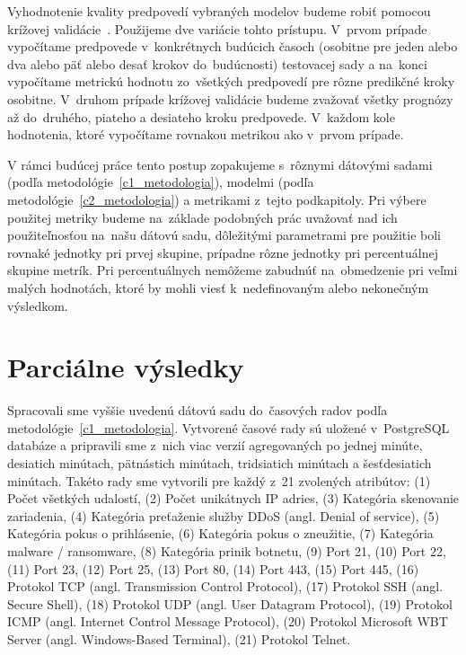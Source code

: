 \documentclass[thesismargins, thesislinespacing, openright, upjsfrontpage]{rnthesis}
\begin{document}
Vyhodnotenie kvality predpovedí vybraných modelov budeme robiť pomocou krížovej validácie~\cite{hyndman2018forecasting}. Použijeme dve variácie tohto prístupu. V~prvom prípade vypočítame predpovede v~konkrétnych budúcich časoch (osobitne pre jeden alebo dva alebo päť alebo desať krokov do~budúcnosti) testovacej sady a na~konci vypočítame metrickú hodnotu zo~všetkých predpovedí pre rôzne predikčné kroky osobitne. V~druhom prípade krížovej validácie budeme zvažovať všetky prognózy až do~druhého, piateho a desiateho kroku predpovede. V~každom kole hodnotenia, ktoré vypočítame rovnakou metrikou ako v~prvom prípade.

V rámci budúcej práce tento postup zopakujeme s~rôznymi dátovými sadami (podľa metodológie~\ref{c1_metodologia}), modelmi (podľa metodológie~\ref{c2_metodologia}) a metrikami z~tejto podkapitoly. Pri výbere použitej metriky budeme na~základe podobných prác uvažovať nad ich použiteľnosťou na~našu dátovú sadu, dôležitými parametrami pre použitie boli rovnaké jednotky pri prvej skupine, prípadne rôzne jednotky pri percentuálnej skupine metrík. Pri percentuálnych nemôžeme zabudnúť na~obmedzenie pri veľmi malých hodnotách, ktoré by mohli viesť k~nedefinovaným alebo nekonečným výsledkom.

\chapter{Parciálne výsledky}

Spracovali sme vyššie uvedenú dátovú sadu do~časových radov podľa metodológie~\ref{c1_metodologia}. Vytvorené časové rady sú uložené v~PostgreSQL databáze a pripravili sme z~nich viac verzií agregovaných po jednej minúte, desiatich minútach, pätnástich minútach, tridsiatich minútach a šesťdesiatich minútach. Takéto rady sme vytvorili pre každý z~21 zvolených atribútov: (1) Počet všetkých udalostí, (2) Počet unikátnych IP adries, (3)  Kategória skenovanie zariadenia, (4) Kategória preťaženie služby DDoS (angl. Denial of service), (5) Kategória pokus o prihlásenie, (6) Kategória pokus o zneužitie, (7) Kategória malware / ransomware, (8) Kategória prinik botnetu, (9) Port 21, (10) Port 22, (11) Port 23, (12) Port 25, (13) Port 80, (14) Port 443, (15) Port 445, (16) Protokol TCP (angl. Transmission Control Protocol), (17) Protokol SSH (angl. Secure Shell), (18) Protokol UDP (angl. User Datagram Protocol), (19) Protokol ICMP (angl. Internet Control Message Protocol), (20) Protokol Microsoft WBT Server (angl. Windows-Based Terminal), (21) Protokol Telnet.
\end{document}
